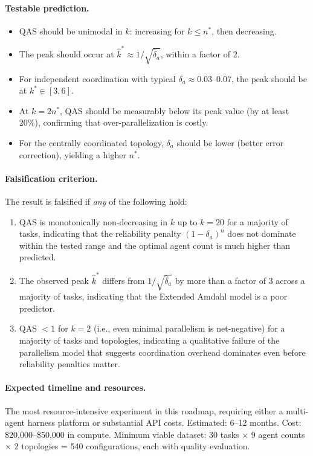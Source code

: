 \documentclass[11pt, a4paper, logo, copyright]{googledeepmind}
\begin{document}
\paragraph{Testable prediction.}
\begin{itemize}[nosep]
    \item QAS should be unimodal in $k$: increasing for $k \leq n^*$, then decreasing.
    \item The peak should occur at $\hat{k}^* \approx 1/\sqrt{\hat{\delta}_a}$, within a factor of 2.
    \item For independent coordination with typical $\delta_a \approx 0.03$--$0.07$, the peak should be at $k^* \in [3, 6]$.
    \item At $k = 2n^*$, QAS should be measurably below its peak value (by at least 20\%), confirming that over-parallelization is costly.
    \item For the centrally coordinated topology, $\delta_a$ should be lower (better error correction), yielding a higher $n^*$.
\end{itemize}

\paragraph{Falsification criterion.} The result is falsified if \emph{any} of the following hold:
\begin{enumerate}[nosep]
    \item QAS is monotonically non-decreasing in $k$ up to $k = 20$ for a majority of tasks, indicating that the reliability penalty $(1-\delta_a)^n$ does not dominate within the tested range and the optimal agent count is much higher than predicted.
    \item The observed peak $\hat{k}^*$ differs from $1/\sqrt{\hat{\delta}_a}$ by more than a factor of 3 across a majority of tasks, indicating that the Extended Amdahl model is a poor predictor.
    \item QAS $< 1$ for $k = 2$ (i.e., even minimal parallelism is net-negative) for a majority of tasks and topologies, indicating a qualitative failure of the parallelism model that suggests coordination overhead dominates even before reliability penalties matter.
\end{enumerate}

\paragraph{Expected timeline and resources.} The most resource-intensive experiment in this roadmap, requiring either a multi-agent harness platform or substantial API costs. Estimated: 6--12 months. Cost: \$20,000--\$50,000 in compute. Minimum viable dataset: 30 tasks $\times$ 9 agent counts $\times$ 2 topologies = 540 configurations, each with quality evaluation.
\end{document}
